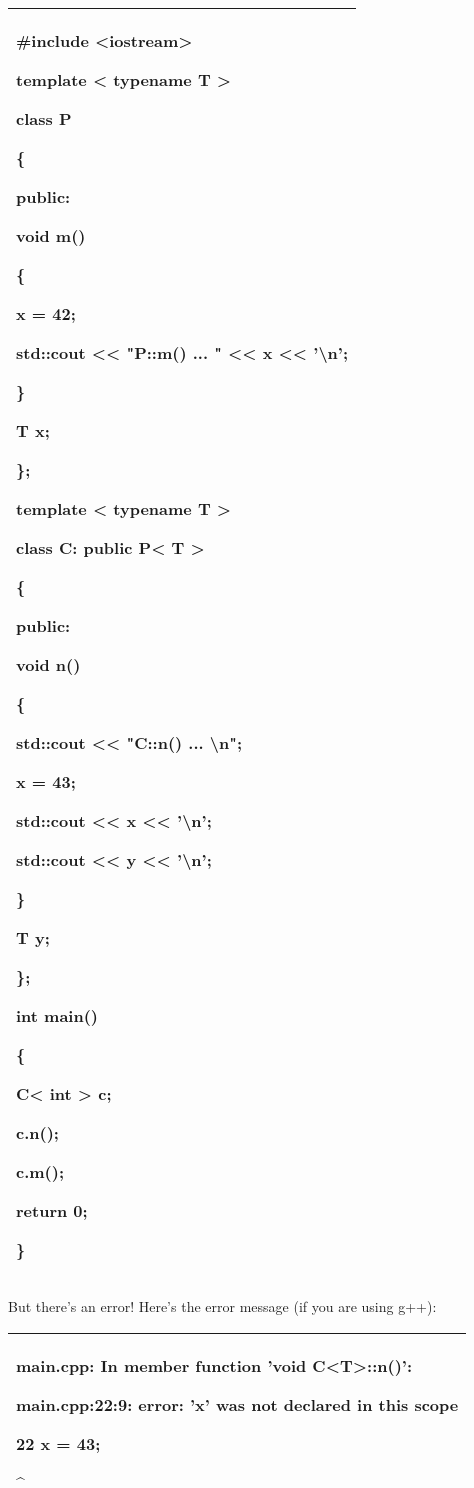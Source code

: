 \documentclass[
]{article}
\begin{document}
\begin{longtable}[]{@{}l@{}}
\toprule
\endhead
\begin{minipage}[t]{0.97\columnwidth}\raggedright
\#include \textless iostream\textgreater{}

template \textless{} typename T \textgreater{}

class P

\{

public:

void m()

\{

x = 42;

std::cout \textless\textless{} "P::m() ... " \textless\textless{} x
\textless\textless{} '\textbackslash n';

\}

T x;

\};

template \textless{} typename T \textgreater{}

class C: public P\textless{} T \textgreater{}

\{

public:

void n()

\{

std::cout \textless\textless{} "C::n() ... \textbackslash n";

x = 43;

std::cout \textless\textless{} x \textless\textless{}
'\textbackslash n';

std::cout \textless\textless{} y \textless\textless{}
'\textbackslash n';

\}

T y;

\};

int main()

\{

C\textless{} int \textgreater{} c;

c.n();

c.m();

return 0;

\}\strut
\end{minipage}\tabularnewline
\bottomrule
\end{longtable}

But there's an error! Here's the error message (if you are using g++):

\begin{longtable}[]{@{}l@{}}
\toprule
\endhead
\begin{minipage}[t]{0.97\columnwidth}\raggedright
main.cpp: In member function 'void C\textless T\textgreater::n()':

main.cpp:22:9: error: 'x' was not declared in this scope

22 \textbar{} x = 43;

\textbar{} \^{}\strut
\end{minipage}\tabularnewline
\bottomrule
\end{longtable}
\end{document}

